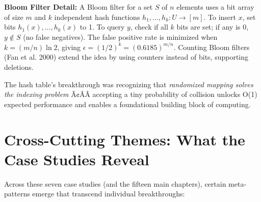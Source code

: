 \textbf{Bloom Filter Detail:} A Bloom filter for a set $S$ of $n$ elements uses a bit array of size $m$ and $k$ independent hash functions $h_1,\dots,h_k : U \to [m]$. To insert $x$, set bits $h_1(x),\dots,h_k(x)$ to 1. To query $y$, check if all $k$ bits are set; if any is 0, $y \notin S$ (no false negatives). The false positive rate is minimized when $k = (m/n)\ln 2$, giving $\epsilon = (1/2)^k = (0.6185)^{m/n}$. Counting Bloom filters (Fan et al. 2000) extend the idea by using counters instead of bits, supporting deletions.

\begin{mentalLeap}The hash table's breakthrough was recognizing that \emph{randomized mapping solves the indexing problem} Ã¢ÂÂ accepting a tiny probability of collision unlocks O(1) expected performance and enables a foundational building block of computing.\end{mentalLeap}

\section{Cross-Cutting Themes: What the Case Studies Reveal}
\label{sec:anatomy:cross_cutting}

Across these seven case studies (and the fifteen main chapters), certain meta-patterns emerge that transcend individual breakthroughs:

